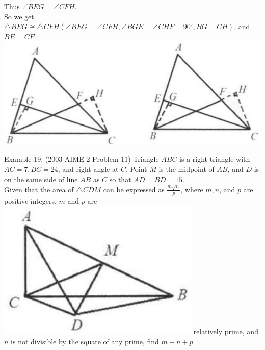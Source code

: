 \documentclass[10pt]{article}
\begin{document}
Thus \(\angle B E G=\angle C F H\).\\
So we get \(\triangle B E G \cong \triangle C F H\left(\angle B E G=\angle C F H, \angle B G E=\angle C H F=90^{\circ}, B G=C H\right)\), and \(B E=C F\).\\
\includegraphics[max width=\textwidth, center]{2025_04_17_97bc1f7e44d93c271a88g-085}


Example 19. (2003 AIME 2 Problem 11) Triangle \(A B C\) is a right triangle with \(A C=7, B C=24\), and right angle at \(C\). Point \(M\) is the midpoint of \(A B\), and \(D\) is on the same side of line \(A B\) as \(C\) so that \(A D=B D=15\).\\
Given that the area of \(\triangle C D M\) can be expressed as \(\frac{m \sqrt{n}}{p}\), where \(m, n\), and \(p\) are positive integers, \(m\) and \(p\) are\\
\includegraphics[max width=\textwidth]{2025_04_17_97bc1f7e44d93c271a88g-086} relatively prime, and \(n\) is not divisible by the square of any prime, find \(m+n+p\).
\end{document}
